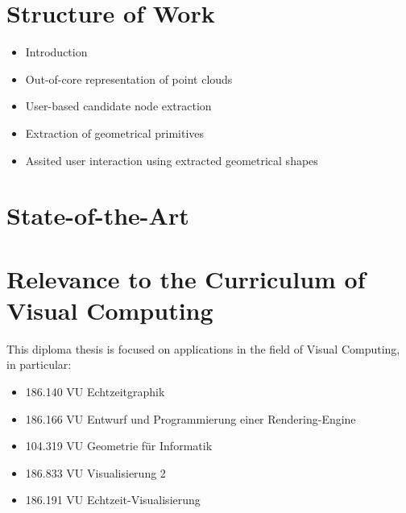 \documentclass[]{article}
\begin{document}
\section{Structure of Work}
\begin{itemize}
	\item Introduction
	\item Out-of-core representation of point clouds
	\item User-based candidate node extraction
	\item Extraction of geometrical primitives
	\item Assited user interaction using extracted geometrical shapes
\end{itemize}
\section{State-of-the-Art}


\section{Relevance to the Curriculum of Visual Computing}

This diploma thesis is focused on applications in the field of Visual Computing, in particular: 

\begin{itemize}
	\item 186.140 VU Echtzeitgraphik
	\item 186.166 VU Entwurf und Programmierung einer Rendering-Engine
	\item 104.319 VU Geometrie für Informatik
	\item 186.833 VU Visualisierung 2
	\item 186.191 VU Echtzeit-Visualisierung
\end{itemize}



\end{document}
